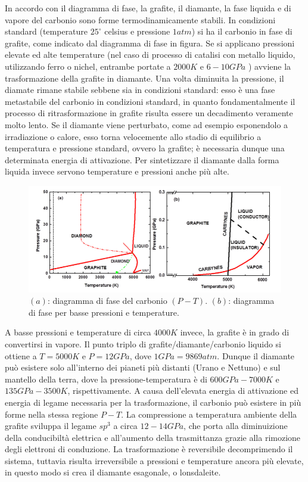 \documentclass[a4paper,titlepage]{book}
\begin{document}
In accordo con il diagramma di fase, la grafite, il diamante, la fase liquida e di vapore del carbonio sono forme termodinamicamente stabili.
In condizioni standard (temperature $25^\circ$  celsius e pressione $1 atm$) si ha il carbonio in fase di grafite, come indicato dal diagramma di fase in figura. Se si applicano pressioni elevate ed alte temperature (nel caso di processo di catalisi con metallo liquido, utilizzando ferro o nichel, entrambe portate a $2000 K$ e $6-10 GPa$ ) avviene la trasformazione della grafite in diamante. Una volta diminuita la pressione, il diamate rimane stabile sebbene sia in condizioni standard: esso è una fase metastabile del carbonio in condizioni standard, in quanto fondamentalmente il processo di ritrasformazione in grafite risulta essere un decadimento veramente molto lento. Se il diamante viene perturbato, come ad esempio esponendolo a irradiazione o calore, esso torna velocemente allo stadio di equilibrio a temperatura e pressione standard, ovvero la grafite; è necessaria dunque una determinata energia di attivazione.
Per sintetizzare il diamante dalla forma liquida invece servono temperature e pressioni anche più alte.
\begin{figure}[h] 
	\centering \includegraphics[width=1\columnwidth]{dyagramphase.png}
	\caption{
		\label{fig:dyagramphase}  $(a)$: diagramma di fase del carbonio $(P - T)$. $(b)$: diagramma di fase per basse pressioni e temperature.
	}
	\label{phases}
\end{figure}

A basse pressioni e temperature di circa $4000 K$ invece, la grafite è in grado di convertirsi in vapore. 
Il punto triplo di grafite/diamante/carbonio liquido si ottiene a $T=5000K$ e $P=12GPa$, dove $1GPa=9869atm$.
Dunque il diamante può esistere solo all'interno dei pianeti più distanti (Urano e Nettuno) e sul mantello della terra, dove la pressione-temperatura è di  $600 GPa-7000 K$ e $135 GPa-3500 K$, rispettivamente.
A causa dell'elevata energia di attivazione ed energia di legame necessaria per la trasformazione, il carbonio può esistere in più forme nella stessa regione $P-T$. 
La compressione a temperatura ambiente della grafite sviluppa il legame $sp^3$ a circa $12-14 GPa$, che porta alla diminuizione della conducibiltà elettrica e all'aumento della trasmittanza grazie alla rimozione degli elettroni di conduzione. La trasformazione è reversibile decomprimendo il sistema, tuttavia risulta irreversibile a pressioni e temperature ancora più elevate, in questo modo si crea il diamante esagonale, o lonsdaleite. 
\end{document}
